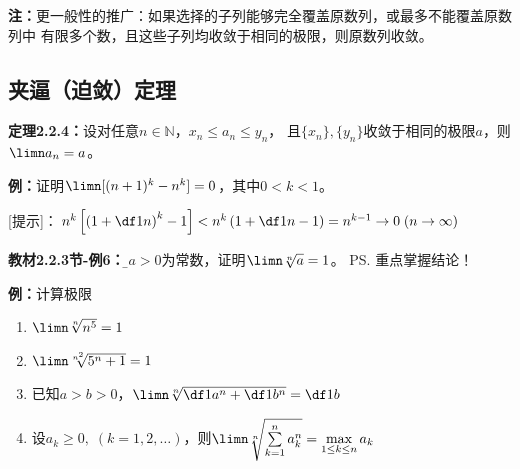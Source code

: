 {\bf 注：}更一般性的推广：如果选择的子列能够完全覆盖原数列，或最多不能覆盖原数列中
有限多个数，且这些子列均收敛于相同的极限，则原数列收敛。

\subsection{夹逼（迫敛）定理}

{\bf 定理2.2.4：}设对任意$n\in\mathbb{N}$，$x_n\le a_n\le y_n$，
且$\{x_n\},\{y_n\}$收敛于相同的极限$a$，则$\limn a_n=a$。

\begin{center}
\end{center}

{\bf 例：}证明$\limn [(n+1)^k-{n}^k]=0$，其中$0<k<1$。

[提示]：$n^k\left[\left(1+\df1n\right)^k-1\right]
<n^k\left(1+\df1n-1\right)=n^{k-1}\to 0\;(n\to\infty)$

\bigskip

{\bf 教材2.2.3节-例6：}{\b 设$a>0$为常数，证明$\limn \sqrt[n]{a}=1$。}
\ps{重点掌握结论！}

{\bf 例：}计算极限
\begin{enumerate}[(1)]
  \setlength{\itemindent}{1cm}
  \item $\limn\sqrt[n]{n^5}=1$
  \item $\limn\sqrt[n^2]{5^n+1}=1$
  \item 已知$a>b>0$，$\limn\sqrt[n]{\df1{a^n}+\df1{b^n}}=\df1b$
  \item 设$a_k\geq0,\;(k=1,2,\ldots)$，则$\limn\sqrt[n]
  {\sum\limits_{k=1}^na_k^n}=\max\limits_{1\leq k\leq n}a_k$
\end{enumerate}
 
